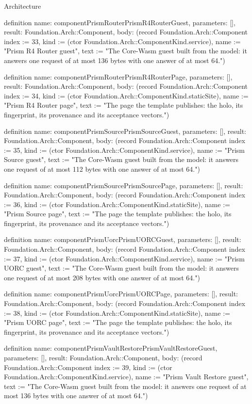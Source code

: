 \begin{lexlean}{Architecture}
\begin{semanticmodule}
definition{
  name: componentPrismRouterPrismR4RouterGuest,
  parameters: [],
  result: Foundation.Arch::Component,
  body: (record Foundation.Arch::Component {index := 33, kind := (ctor Foundation.Arch::ComponentKind.service), name := "Prism R4 Router guest", text := "The Core-Wasm guest built from the model: it answers one request of at most 136 bytes with one answer of at most 64."})
}

definition{
  name: componentPrismRouterPrismR4RouterPage,
  parameters: [],
  result: Foundation.Arch::Component,
  body: (record Foundation.Arch::Component {index := 34, kind := (ctor Foundation.Arch::ComponentKind.staticSite), name := "Prism R4 Router page", text := "The page the template publishes: the holo, its fingerprint, its provenance and its acceptance vectors."})
}

definition{
  name: componentPrismSourcePrismSourceGuest,
  parameters: [],
  result: Foundation.Arch::Component,
  body: (record Foundation.Arch::Component {index := 35, kind := (ctor Foundation.Arch::ComponentKind.service), name := "Prism Source guest", text := "The Core-Wasm guest built from the model: it answers one request of at most 112 bytes with one answer of at most 64."})
}

definition{
  name: componentPrismSourcePrismSourcePage,
  parameters: [],
  result: Foundation.Arch::Component,
  body: (record Foundation.Arch::Component {index := 36, kind := (ctor Foundation.Arch::ComponentKind.staticSite), name := "Prism Source page", text := "The page the template publishes: the holo, its fingerprint, its provenance and its acceptance vectors."})
}

definition{
  name: componentPrismUorcPrismUORCGuest,
  parameters: [],
  result: Foundation.Arch::Component,
  body: (record Foundation.Arch::Component {index := 37, kind := (ctor Foundation.Arch::ComponentKind.service), name := "Prism UORC guest", text := "The Core-Wasm guest built from the model: it answers one request of at most 208 bytes with one answer of at most 64."})
}

definition{
  name: componentPrismUorcPrismUORCPage,
  parameters: [],
  result: Foundation.Arch::Component,
  body: (record Foundation.Arch::Component {index := 38, kind := (ctor Foundation.Arch::ComponentKind.staticSite), name := "Prism UORC page", text := "The page the template publishes: the holo, its fingerprint, its provenance and its acceptance vectors."})
}

definition{
  name: componentPrismVaultRestorePrismVaultRestoreGuest,
  parameters: [],
  result: Foundation.Arch::Component,
  body: (record Foundation.Arch::Component {index := 39, kind := (ctor Foundation.Arch::ComponentKind.service), name := "Prism Vault Restore guest", text := "The Core-Wasm guest built from the model: it answers one request of at most 136 bytes with one answer of at most 64."})
}


\end{semanticmodule}
\end{lexlean}
